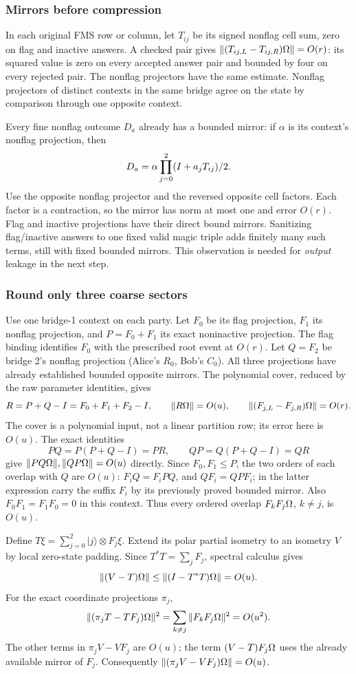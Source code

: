 \subsubsection{Mirrors before compression}
In each original FMS row or column, let $T_{ij}$ be its signed nonflag cell sum, zero on flag and inactive answers. A checked pair gives
$\left\lVert(T_{ij,L}-T_{ij,R})\Omega\right\rVert=O(r)$: its squared value is zero on every accepted answer pair and bounded by four on every rejected pair. The nonflag projectors have the same estimate. Nonflag projectors of distinct contexts in the same bridge agree on the state by comparison through one opposite context.

Every fine nonflag outcome $D_a$ already has a bounded mirror: if $\alpha$ is its context's nonflag projection, then
\[
D_a=\alpha\prod_{j=0}^2(I+a_jT_{ij})/2.
\]
Use the opposite nonflag projector and the reversed opposite cell factors. Each factor is a contraction, so the mirror has norm at most one and error $O(r)$. Flag and inactive projections have their direct bound mirrors. Sanitizing flag/inactive answers to one fixed valid magic triple adds finitely many such terms, still with fixed bounded mirrors. This observation is needed for \emph{output} leakage in the next step.

\subsubsection{Round only three coarse sectors}
Use one bridge-1 context on each party. Let $F_0$ be its flag projection, $F_1$ its nonflag projection, and $P=F_0+F_1$ its exact noninactive projection. The flag binding identifies $F_0$ with the prescribed root event at $O(r)$. Let $Q=F_2$ be bridge 2's nonflag projection (Alice's $R_0$, Bob's $C_0$). All three projections have already established bounded opposite mirrors. The polynomial cover, reduced by the raw parameter identities, gives
\[
 R=P+Q-I=F_0+F_1+F_2-I,\qquad \|R\Omega\|=O(u),
 \qquad \|(F_{j,L}-F_{j,R})\Omega\|=O(r).
\]
The cover is a polynomial input, not a linear partition row; its error here is $O(u)$.
The exact identities
\[
 PQ=P(P+Q-I)=PR,\qquad QP=Q(P+Q-I)=QR
\]
give $\|PQ\Omega\|,\|QP\Omega\|=O(u)$ directly. Since $F_0,F_1\le P$, the two orders of each overlap with $Q$ are $O(u)$: $F_iQ=F_iPQ$, and $QF_i=QPF_i$; in the latter expression carry the suffix $F_i$ by its previously proved bounded mirror. Also $F_0F_1=F_1F_0=0$ in this context. Thus every ordered overlap $F_kF_j\Omega$, $k\ne j$, is $O(u)$.

Define $T\xi=\sum_{j=0}^2|j\rangle\otimes F_j\xi$. Extend its polar partial isometry to an isometry $V$ by local zero-state padding. Since $T^*T=\sum_jF_j$, spectral calculus gives
\[
 \|(V-T)\Omega\|\le\|(I-T^*T)\Omega\|=O(u).
\]
For the exact coordinate projections $\pi_j$,
\[
 \|(\pi_jT-TF_j)\Omega\|^2
 =\sum_{k\ne j}\|F_kF_j\Omega\|^2=O(u^2).
\]
The other terms in $\pi_jV-VF_j$ are $O(u)$; the term $(V-T)F_j\Omega$ uses the already available mirror of $F_j$. Consequently
$\|(\pi_jV-VF_j)\Omega\|=O(u)$.

